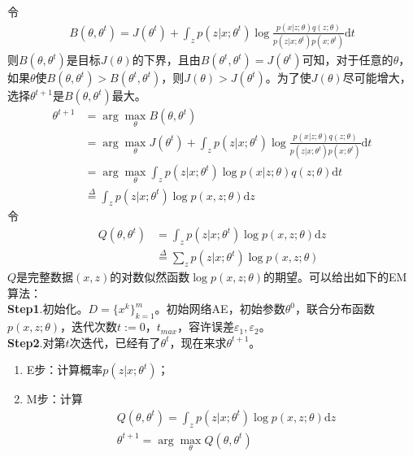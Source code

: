             令
            \begin{align*}
            B(\theta,\theta^t) = J(\theta^t) + \int_zp(z|x;\theta^t) \log\frac{p(x|z;\theta) q(z;\theta)}{p(z|x;\theta^t)p(x;\theta^t)}\mathrm{d}t
            \end{align*}
            则$B(\theta,\theta^t)$是目标$J(\theta)$的下界，且由$B(\theta^t,\theta^t) = J(\theta^t)$可知，对于任意的$\theta$，如果$\theta$使$B(\theta ,\theta^t)>B(\theta^t,\theta^t)$，则$J(\theta)>J(\theta^t)$。为了使$J(\theta)$尽可能增大，选择$\theta^{t+1}$是$B(\theta,\theta^t)$最大。
            \begin{align*}
            \theta^{t+1} & = \arg \max_\theta B(\theta,\theta^t)\\
            & = \arg \max_\theta J(\theta^t) + \int_zp(z|x;\theta^t) \log\frac{p(x|z;\theta) q(z;\theta)}{p(z|x;\theta^t)p(x;\theta^t)}\mathrm{d}t\\
            & = \arg \max_\theta \int_z p(z|x;\theta^t) \log p(x|z;\theta)q(z;\theta)\mathrm{d}t\\
            & \overset{\Delta}{= } \int_z p(z|x;\theta^t)\log p(x,z;\theta)\mathrm{d}z
            \end{align*}
            令
            \begin{align*}
            Q(\theta,\theta^t) & = \int_z p(z|x;\theta^t)\log p(x,z;\theta)\mathrm{d}z\\
            & \overset{\Delta}{=} \sum_z p(z|x;\theta^t)\log p(x,z;\theta)
            \end{align*}
            $Q$是完整数据$(x,z)$的对数似然函数$\log p(x,z;\theta)$的期望。可以给出如下的EM算法：\\
            \textbf{Step1}.初始化。$D = \{x^k\}_{k=1}^m$。初始网络AE，初始参数$\theta^0$，联合分布函数$p(x,z;\theta)$，迭代次数$t:=0$，$t_{max}$，容许误差$\varepsilon_1,\varepsilon_2$。\\
            \textbf{Step2}.对第$t$次迭代，已经有了$\theta^t$，现在来求$\theta^{t+1}$。
            \begin{enumerate}
            \item E步：计算概率$p(z|x;\theta^t)$；
            \item M步：计算
            \begin{align*}
            & Q(\theta,\theta^t)= \int_z p(z|x;\theta^t)\log p(x,z;\theta)\mathrm{d}z\\
            & \theta^{t+1} = \arg\max_\theta Q(\theta,\theta^t)
            \end{align*}
            \end{enumerate}
